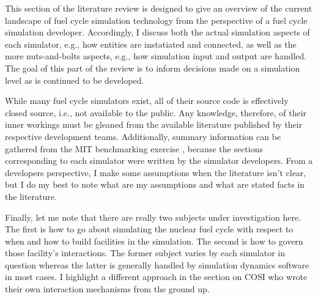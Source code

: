 This section of the literature review is designed to give an overview of the
current landscape of fuel cycle simulation technology from the perspective of a
fuel cycle simulation developer. Accordingly, I discuss both the actual
simulation aspects of each simulator, e.g., how entities are instatiated and
connected, as well as the more nuts-and-bolts aspects, e.g., how simulation input
and output are handled. The goal of this part of the review is to inform
decisions made on a simulation level as \Cyclus is continued to be developed.

While many fuel cycle simulators exist, all of their source code is effectively
closed source, i.e., not available to the public. Any knowledge, therefore, of
their inner workings must be gleaned from the available literature published by
their respective development teams. Additionally, summary information can be
gathered from the MIT benchmarking exercise \cite{guerin_benchmark_2009},
because the sections corresponding to each simulator were written by the
simulator developers. From a developers perspective, I make some assumptions
when the literature isn't clear, but I do my best to note what are my
assumptions and what are stated facts in the literature.

Finally, let me note that there are really two subjects under investigation
here. The first is how to go about simulating the nuclear fuel cycle with
respect to when and how to build facilities in the simulation. The second is how
to govern those facility's interactions. The former subject varies by each
simulator in question whereas the latter is generally handled by simulation
dynamics software in most cases. I highlight a different approach in the section
on COSI who wrote their own interaction mechanisms from the ground up.
